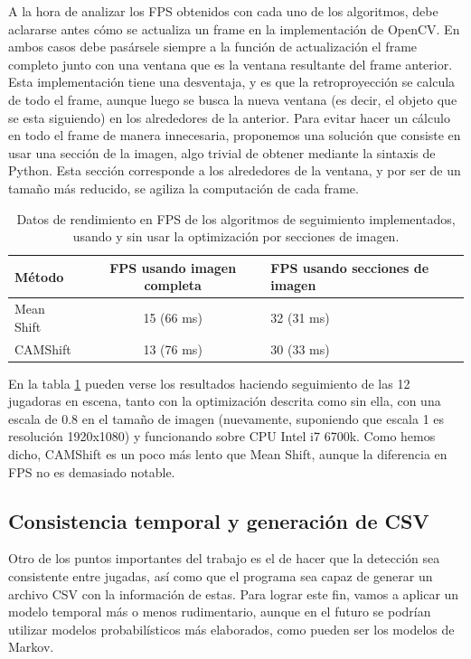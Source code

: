 A la hora de analizar los FPS obtenidos con cada uno de los algoritmos, debe aclararse antes cómo se actualiza un frame en la implementación de OpenCV. En ambos casos debe pasársele siempre a la función de actualización el frame completo junto con una ventana que es la ventana resultante del frame anterior. Esta implementación tiene una desventaja, y es que la retroproyección se calcula de todo el frame, aunque luego se busca la nueva ventana (es decir, el objeto que se esta siguiendo) en los alrededores de la anterior. Para evitar hacer un cálculo en todo el frame de manera innecesaria, proponemos una solución que consiste en usar una sección de la imagen, algo trivial de obtener mediante la sintaxis de Python. Esta sección corresponde a los alrededores de la ventana, y por ser de un tamaño más reducido, se agiliza la computación de cada frame.

\begin{table}
  \centering
  \begin{tabular}{|l|c|l|}\hline
  \textbf{Método} & \multicolumn{1}{m{4cm}|}{\textbf{FPS usando imagen completa}}&  \multicolumn{1}{m{4cm}|}{\textbf{FPS usando secciones de imagen}}\\\hline
  Mean Shift & 15 (66 ms) & 32 (31 ms) \\\hline
  CAMShift & 13 (76 ms)& 30 (33 ms)\\\hline
  \end{tabular}
\caption{Datos de rendimiento en FPS de los algoritmos de seguimiento implementados, usando y sin usar la optimización por secciones de imagen.}
\label{tab:2}
\end{table}

En la tabla \ref{tab:2} pueden verse los resultados haciendo seguimiento de las 12 jugadoras en escena, tanto con la optimización descrita como sin ella, con una escala de 0.8 en el tamaño de imagen (nuevamente, suponiendo que escala 1 es resolución 1920x1080) y funcionando sobre CPU Intel i7 6700k. Como hemos dicho, CAMShift es un poco más lento que Mean Shift, aunque la diferencia en FPS no es demasiado notable.

\subsection{Consistencia temporal y generación de CSV}
Otro de los puntos importantes del trabajo es el de hacer que la detección sea consistente entre jugadas, así como que el programa sea capaz de generar un archivo CSV con la información de estas. Para lograr este fin, vamos a aplicar un modelo temporal más o menos rudimentario, aunque en el futuro se podrían utilizar modelos probabilísticos más elaborados, como pueden ser los modelos de Markov.

